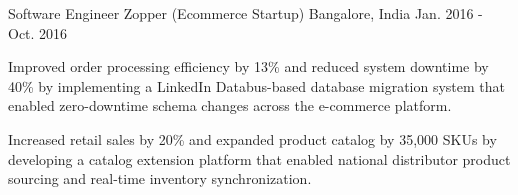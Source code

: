 \begin{cventries}
\cventry
    {Software Engineer} %
    {Zopper (Ecommerce Startup)} %
    {Bangalore, India} %
    {Jan. 2016 - Oct. 2016} %
    {
      \begin{cvitems} %
        \item {Improved order processing efficiency by 13\% and reduced system downtime by 40\% by implementing a LinkedIn Databus-based database migration system that enabled zero-downtime schema changes across the e-commerce platform.}
        \item {Increased retail sales by 20\% and expanded product catalog by 35,000 SKUs by developing a catalog extension platform that enabled national distributor product sourcing and real-time inventory synchronization.}
      \end{cvitems}
    }
\end{cventries}
